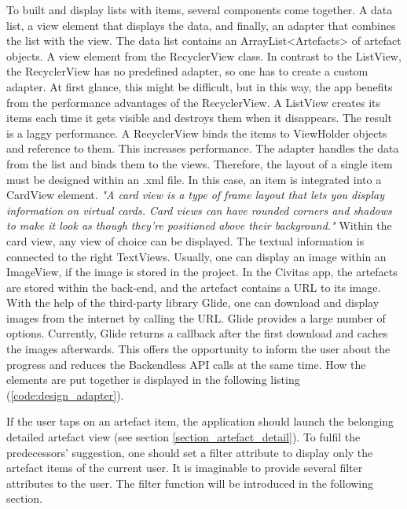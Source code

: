To built and display lists with items, several components come together. A data list, a view element that displays the data, and finally, an adapter that combines the list with the view. The data list contains an ArrayList<Artefacts> of artefact objects. A view element from the  RecyclerView class. In contrast to the ListView, the RecyclerView has no predefined adapter, so one has to create a custom adapter. At first glance, this might be difficult, but in this way, the app benefits from the performance advantages of the RecyclerView. A ListView creates its items each time it gets visible and destroys them when it disappears. The result is a laggy performance. A RecyclerView binds the items to ViewHolder objects and reference to them. This increases performance. 
The adapter handles the data from the list and binds them to the views. Therefore, the layout of a single item must be designed within an .xml file. In this case, an item is integrated into a CardView element. \textit{"A card view is a type of frame layout that lets you display information on virtual cards. Card views can have rounded corners and shadows to make it look as though they're positioned above their background."} \citep[p. 542]{Griffiths:2017}
Within the card view, any view of choice can be displayed. The textual information is connected to the right TextViews. Usually, one can display an image within an ImageView, if the image is stored in the project. In the Civitas app, the artefacts are stored within the back-end, and the artefact contains a URL to its image. With the help of the third-party library Glide, one can download and display images from the internet by calling the URL. Glide provides a large number of options. Currently, Glide returns a callback after the first download and caches the images afterwards. This offers the opportunity to inform the user about the progress and reduces the Backendless API calls at the same time. How the elements are put together is displayed in the following listing (\ref{code:design_adapter}).

\begin{mdframed}

\end{mdframed}

If the user taps on an artefact item, the application should launch the belonging detailed artefact view (see section \ref{section_artefact_detail}). To fulfil the predecessors' suggestion, one should set a filter attribute to display only the artefact items of the current user. It is imaginable to provide several filter attributes to the user. The filter function will be introduced in the following section.


